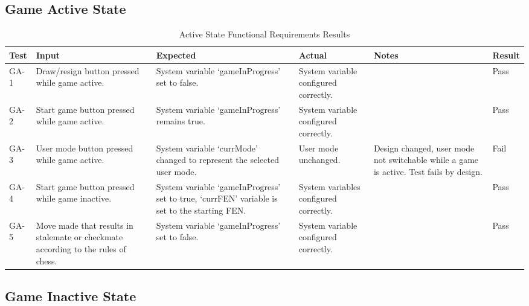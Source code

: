 \documentclass[12pt, titlepage]{article}
\begin{document}
\subsection{Game Active State}

\begin{table}[H]
    \centering
        \setlength{\leftmargini}{0.4cm}
        \begin{tabular}{| >{\centering\arraybackslash}m{1cm} | 
            >{\centering\arraybackslash}m{2.5cm} | 
            >{\centering\arraybackslash}m{4cm} | 
            >{\centering\arraybackslash}m{3cm} |
            >{\centering\arraybackslash}m{3cm} |
            >{\centering\arraybackslash}m{1.5cm} |}
        \hline
        \rowcolor[gray]{0.9}
        Test & Input & Expected & Actual & Notes & Result\\
        \hline
        GA-1 & Draw/resign button pressed while game active. & System variable `gameInProgress' set to false. &  System variable configured correctly. &  & Pass \\
        \hline
        GA-2 & Start game button pressed while game active. & System variable `gameInProgress' remains true. &  System variable configured correctly. &  & Pass \\
        \hline
        GA-3 & User mode button pressed while game active. & System variable `currMode' changed to represent the selected user mode. &  User mode unchanged. & Design changed, user mode not switchable while a game is active. Test fails by design. & Fail \\
        \hline
        GA-4 & Start game button pressed while game inactive. & System variable `gameInProgress' set to true, `currFEN' variable is set to the starting FEN. &  System variables configured correctly. &  & Pass \\
        \hline
        GA-5 & Move made that results in stalemate or checkmate according to the rules of chess. & System variable `gameInProgress' set to false. &  System variable configured correctly. &  & Pass \\ 
        \hline
        \end{tabular}
    \caption{Active State Functional Requirements Results}
\end{table}

\subsection{Game Inactive State}
\end{document}
